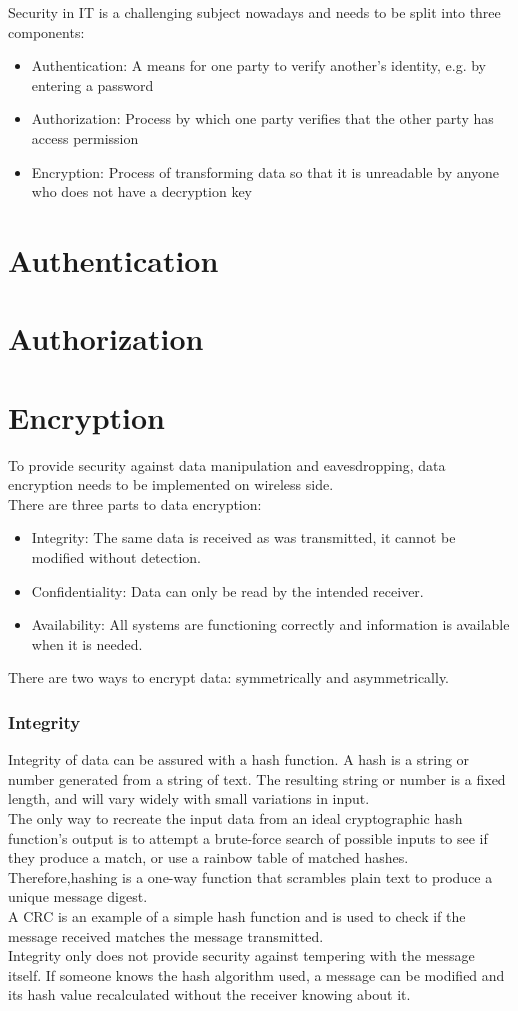 %
\cite{Security_BuEdu} Security in IT is a challenging subject nowadays and needs to be split into three components:
\begin{itemize}
    \item Authentication: A means for one party to verify another's identity, e.g. by entering a password
    \item Authorization: Process by which one party verifies that the other party has access permission
    \item Encryption: Process of transforming data so that it is unreadable by anyone who does not have a decryption key
\end{itemize}
%
%
%
\section{Authentication}
%
%
%
\section{Authorization}
%
%
%
\section{Encryption}
To provide security against data manipulation and eavesdropping, data encryption needs to be implemented on wireless side.\\
There are three parts to data encryption:
\begin{itemize}
    \item Integrity: The same data is received as was transmitted, it cannot be modified without detection.
    \item Confidentiality: Data can only be read by the intended receiver.
    \item Availability: All systems are functioning correctly and information is available when it is needed.
\end{itemize}
There are two ways to encrypt data: symmetrically and asymmetrically.
%
\subsubsection{Integrity}
Integrity of data can be assured with a hash function. A hash is a string or number generated from a string of text. The resulting string or number is a fixed length, and will vary widely with small variations in input.\\
The only way to recreate the input data from an ideal cryptographic hash function's output is to attempt a brute-force search of possible inputs to see if they produce a match, or use a rainbow table of matched hashes. Therefore,hashing is a one-way function that scrambles plain text to produce a unique message digest. \\
A CRC is an example of a simple hash function and is used to check if the message received matches the message transmitted.\\
Integrity only does not provide security against tempering with the message itself. If someone knows the hash algorithm used, a message can be modified and its hash value recalculated without the receiver knowing about it.
%
